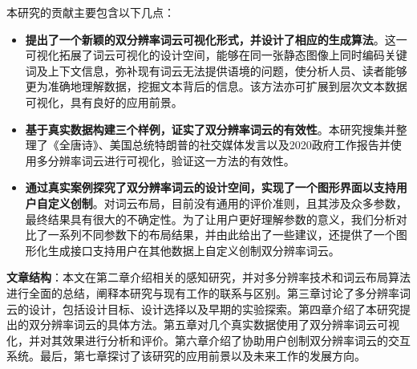 本研究的贡献主要包含以下几点：

\begin{itemize}
	\item \textbf{提出了一个新颖的双分辨率词云可视化形式，并设计了相应的生成算法}。这一可视化拓展了词云可视化的设计空间，能够在同一张静态图像上同时编码关键词及上下文信息，弥补现有词云无法提供语境的问题，使分析人员、读者能够更为准确地理解数据，挖掘文本背后的信息。该方法亦可扩展到层次文本数据可视化，具有良好的应用前景。
	
	\item \textbf{基于真实数据构建三个样例，证实了双分辨率词云的有效性}。本研究搜集并整理了《全唐诗》、美国总统特朗普的社交媒体发言以及2020政府工作报告并使用多分辨率词云进行可视化，验证这一方法的有效性。
	
	
	\item \textbf{通过真实案例探究了双分辨率词云的设计空间，实现了一个图形界面以支持用户自定义创制}。对词云布局，目前没有通用的评价准则，且其涉及众多参数，最终结果具有很大的不确定性。为了让用户更好理解参数的意义，我们分析对比了一系列不同参数下的布局结果，并由此给出了一些建议，还提供了一个图形化生成接口支持用户在其他数据上自定义创制双分辨率词云。
	
\end{itemize}

\bigbreak
\bigbreak

\noindent \textbf{文章结构}：本文在第二章介绍相关的感知研究，并对多分辨率技术和词云布局算法进行全面的总结，阐释本研究与现有工作的联系与区别。第三章讨论了多分辨率词云的设计，包括设计目标、设计选择以及早期的实验探索。第四章介绍了本研究提出的双分辨率词云的具体方法。第五章对几个真实数据使用了双分辨率词云可视化，并对其效果进行分析和评价。第六章介绍了协助用户创制双分辨率词云的交互系统。最后，第七章探讨了该研究的应用前景以及未来工作的发展方向。
